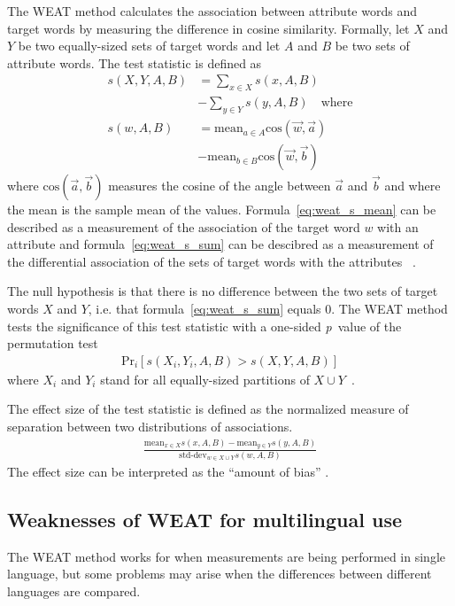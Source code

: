 The WEAT method calculates the association between attribute words and target words
by measuring the difference in cosine similarity. Formally, 
let $X$ and $Y$ be two equally-sized sets of target words and let $A$ and $B$ be two
sets of attribute words. The test statistic is defined as
\begin{align} \label{eq:weat_s_sum}
\textstyle s(X,Y,A,B) &= \displaystyle\sum_{x \in X} s(x,A,B)\nonumber \\
                      &- \displaystyle\sum_{y \in Y} s(y,A,B)\quad\text{where}\\
\label{eq:weat_s_mean}
s(w,A,B) &= \text{mean}_{a \in A} \text{cos}(\vec{w}, \vec{a})
            \nonumber\\
         &- \text{mean}_{b \in B} \text{cos}(\vec{w}, \vec{b})
\end{align}
where $\text{cos}(\overrightarrow{a}, \overrightarrow{b})$ measures the cosine of the angle
between $\vec{a}$ and $\vec{b}$ and where the mean is the sample mean of the values.
Formula~\eqref{eq:weat_s_mean} can be described as a measurement of the association of the
target word $w$ with
an attribute and formula~\eqref{eq:weat_s_sum} can be descibred as a measurement of the
differential association of the sets of target words with the attributes~ 
\parencite{caliskan_2017_semantics_language_corpora}.

The null hypothesis is that there is no difference between the two sets of target words $X$
and $Y$, i.e. that formula~\eqref{eq:weat_s_sum} equals $0$.
The WEAT method tests the significance of this test statistic with a one-sided
\emph{p}~value of the permutation test
\begin{align} \label{eq:weat_p_test}
    \text{Pr}_i[s(X_i,Y_i,A,B) > s(X,Y,A,B)]
\end{align}
where $X_i$ and $Y_i$ stand for all equally-sized partitions of
$X \cup Y$~\parencite{caliskan_2017_semantics_language_corpora}.

The effect size of the test statistic is defined as the normalized measure of separation
between two distributions of associations.
\begin{align} \label{eq:weat_effect_size}
\frac{
    \text{mean}_{x \in X} s(x, A, B) - \text{mean}_{y \in Y} s(y, A, B)
}{
    \text{std-dev}_{w \in X \cup Y} s(w,A,B)
}
\end{align}
The effect size can be interpreted as the ``amount of bias'' \parencite{lauscher-glavas-2019-consistently}.

\subsection{Weaknesses of WEAT for multilingual use}
The WEAT method works for when measurements are being performed in single language, but
some problems may arise when the differences between different languages are
compared.

